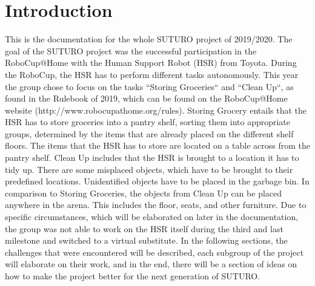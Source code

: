 \documentclass[main.tex]{subfiles}
\begin{document}
	\chapter{Introduction}
	
This is the documentation for the whole SUTURO project of 2019/2020. The goal of the SUTURO project was the successful participation in the RoboCup@Home with the Human Support Robot (HSR) from Toyota. During the RoboCup, the HSR has to perform different tasks autonomously.
This year the group chose to focus on the tasks “Storing Groceries“ and “Clean Up“, as found in the Rulebook of 2019, which can be found on the RoboCup@Home website (http://www.robocupathome.org/rules). 
Storing Grocery entails that the HSR has to store groceries into a pantry shelf, sorting them into appropriate groups, determined by the items that are already placed on the different shelf floors. The items that the HSR has to store are located on a table across from the pantry shelf.
Clean Up includes that the HSR is brought to a location it has to tidy up. There are some misplaced objects, which have to be brought to their predefined locations. Unidentified objects have to be placed in the garbage bin. In comparison to Storing Groceries, the objects from Clean Up can be placed anywhere in the arena. This includes the floor, seats, and other furniture.
Due to specific circumstances, which will be elaborated on later in the documentation, the group was not able to work on the HSR itself during the third and last milestone and switched to a virtual substitute.
In the following sections, the challenges that were encountered will be described, each subgroup of the project will elaborate on their work, and in the end, there will be a section of ideas on how to make the project better for the next generation of SUTURO.
	
\end{document}
